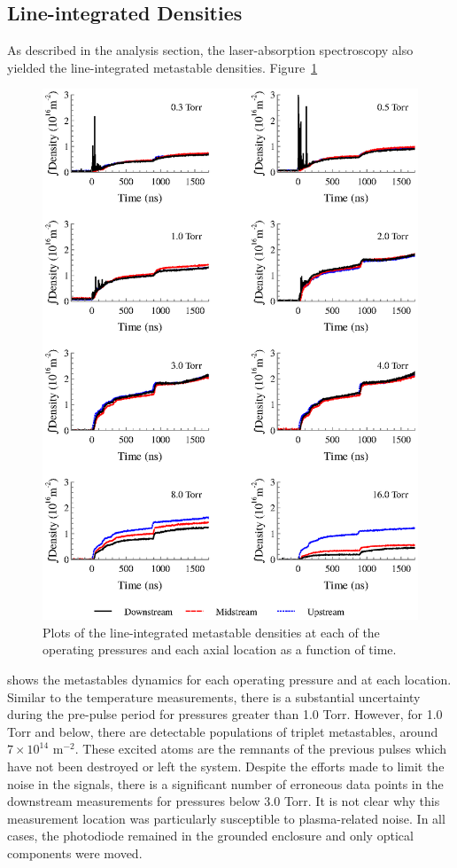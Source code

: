 \subsection{Line-integrated Densities}

As described in the analysis section, the laser-absorption spectroscopy also
yielded the line-integrated metastable densities. Figure~\ref{fig:metastables}
\begin{figure}
  \centering
  \includegraphics{./chapters/metastables/figures/metastables.eps}
  \caption{Plots of the line-integrated metastable densities at each of
  the operating pressures and each axial location as a function of
  time.}
  \label{fig:metastables}
\end{figure}
shows the metastables dynamics for each operating pressure and at each location.
Similar to the temperature measurements, there is a substantial uncertainty
during the pre-pulse period for pressures greater than 1.0 Torr. However, for
1.0 Torr and below, there are detectable populations of triplet metastables,
around $7\times10^{14}$ m$^{-2}$. These excited atoms are the remnants of the
previous pulses which have not been destroyed or left the system. Despite the
efforts made to limit the noise in the signals, there is a significant number of
erroneous data points in the downstream measurements for pressures below 3.0
Torr. It is not clear why this measurement location was particularly susceptible
to plasma-related noise. In all cases, the photodiode remained in the grounded
enclosure and only optical components were moved.

